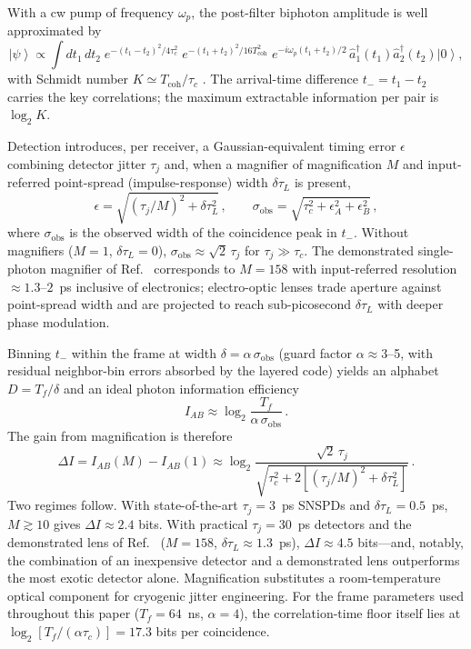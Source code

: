 \documentclass[11pt]{article}
\newcommand{\ket}[1]{\left|#1\right\rangle}
\begin{document}
With a cw pump of frequency $\omega_p$, the post-filter biphoton amplitude is well approximated by
\begin{equation}
\ket{\psi} \propto \int dt_1\, dt_2\; e^{-(t_1-t_2)^2/4\tau_c^2}\; e^{-(t_1+t_2)^2/16T_{\mathrm{coh}}^2}\; e^{-i\omega_p (t_1+t_2)/2}\, \hat a_1^\dagger(t_1)\hat a_2^\dagger(t_2)\ket{0},
\label{eq:state}
\end{equation}
with Schmidt number $K \simeq T_{\mathrm{coh}}/\tau_c$ \cite{LawEberly2004,Grice1997}. The arrival-time difference $t_- = t_1 - t_2$ carries the key correlations; the maximum extractable information per pair is $\log_2 K$.

Detection introduces, per receiver, a Gaussian-equivalent timing error $\epsilon$ combining detector jitter $\tau_j$ and, when a magnifier of magnification $M$ and input-referred point-spread (impulse-response) width $\delta\tau_L$ is present,
\begin{equation}
\epsilon = \sqrt{\left(\tau_j/M\right)^2 + \delta\tau_L^2}\,,
\qquad
\sigma_{\mathrm{obs}} = \sqrt{\tau_c^2 + \epsilon_A^2 + \epsilon_B^2}\,,
\label{eq:resolution}
\end{equation}
where $\sigma_{\mathrm{obs}}$ is the observed width of the coincidence peak in $t_-$. Without magnifiers ($M=1$, $\delta\tau_L=0$), $\sigma_{\mathrm{obs}} \approx \sqrt{2}\,\tau_j$ for $\tau_j \gg \tau_c$. The demonstrated single-photon magnifier of Ref.~\cite{Joshi2022} corresponds to $M=158$ with input-referred resolution $\approx 1.3$--$2$~ps inclusive of electronics; electro-optic lenses \cite{Karpinski2017} trade aperture against point-spread width and are projected to reach sub-picosecond $\delta\tau_L$ with deeper phase modulation.

Binning $t_-$ within the frame at width $\delta = \alpha\, \sigma_{\mathrm{obs}}$ (guard factor $\alpha \approx 3$--5, with residual neighbor-bin errors absorbed by the layered code) yields an alphabet $D = T_f/\delta$ and an ideal photon information efficiency
\begin{equation}
I_{AB} \approx \log_2 \frac{T_f}{\alpha\, \sigma_{\mathrm{obs}}}\,.
\label{eq:pie}
\end{equation}
The gain from magnification is therefore
\begin{equation}
\Delta I = I_{AB}(M) - I_{AB}(1) \approx \log_2 \frac{\sqrt{2}\,\tau_j}{\sqrt{\tau_c^2 + 2\left[(\tau_j/M)^2 + \delta\tau_L^2\right]}}\,.
\label{eq:gain}
\end{equation}
Two regimes follow. With state-of-the-art $\tau_j = 3$~ps SNSPDs \cite{Korzh2020} and $\delta\tau_L = 0.5$~ps, $M \gtrsim 10$ gives $\Delta I \approx 2.4$ bits. With practical $\tau_j = 30$~ps detectors and the demonstrated lens of Ref.~\cite{Joshi2022} ($M=158$, $\delta\tau_L \approx 1.3$~ps), $\Delta I \approx 4.5$ bits---and, notably, the combination of an inexpensive detector and a demonstrated lens outperforms the most exotic detector alone. Magnification substitutes a room-temperature optical component for cryogenic jitter engineering. For the frame parameters used throughout this paper ($T_f = 64$~ns, $\alpha = 4$), the correlation-time floor itself lies at $\log_2[T_f/(\alpha\tau_c)] = 17.3$ bits per coincidence.
\end{document}
